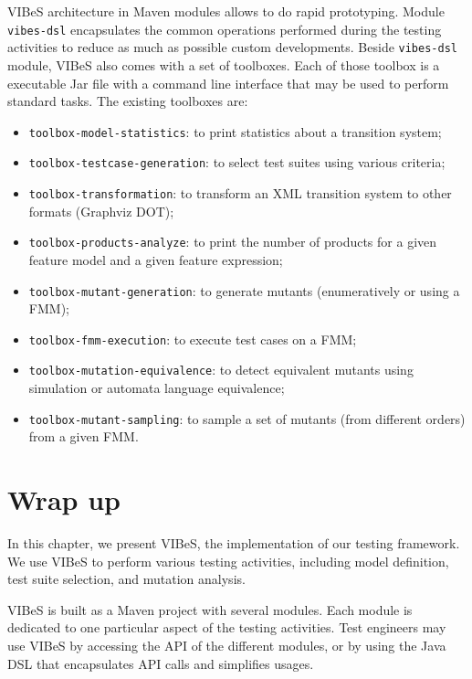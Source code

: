 \gls{VIBeS} architecture in Maven modules allows to do rapid prototyping. Module \texttt{vibes-dsl} encapsulates the common operations performed during the testing activities to reduce as much as possible custom developments. Beside \texttt{vibes-dsl} module,  \gls{VIBeS} also comes with a set of toolboxes. Each of those toolbox is a executable Jar file with a command line interface that may be used to perform standard tasks. The existing toolboxes are:
\begin{itemize}
\item \texttt{toolbox-model-statistics}: to print statistics about a transition system;
\item \texttt{toolbox-testcase-generation}: to select test suites using various criteria;
\item \texttt{toolbox-transformation}: to transform an XML transition system to other formats (\eg Graphviz DOT);
\item \texttt{toolbox-products-analyze}: to print the number of products for a given feature model and a given feature expression;
\item \texttt{toolbox-mutant-generation}: to generate mutants (enumeratively or using a \gls{FMM});
\item \texttt{toolbox-fmm-execution}: to execute test cases on a \gls{FMM};
\item \texttt{toolbox-mutation-equivalence}: to detect equivalent mutants using simulation or automata language equivalence;
\item \texttt{toolbox-mutant-sampling}: to sample a set of mutants (from different orders) from a given \gls{FMM}.
\end{itemize}


\section{Wrap up}

\label{sec:vibesperspectives}

In this chapter, we present \gls{VIBeS}, the implementation of our testing framework. We use \gls{VIBeS} to perform various testing activities, including model definition, test suite selection, and mutation analysis. 

\gls{VIBeS} is built as a Maven project with several modules. Each module is dedicated to one particular aspect of the testing activities. Test engineers may use \gls{VIBeS} by accessing the API of the different modules, or by using the Java DSL that encapsulates API calls and simplifies usages. 

